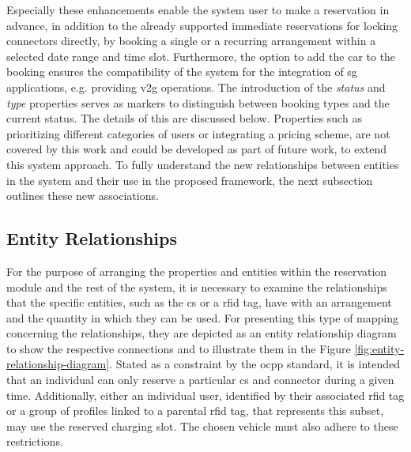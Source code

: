 \noindent Especially these enhancements enable the system user to make a reservation in advance, in addition to the already supported immediate reservations for locking connectors directly, by booking a single or a recurring arrangement within a selected date range and time slot.
Furthermore, the option to add the car to the booking ensures the compatibility of the system for the integration of \acrshort{sg} applications, e.g. providing \acrshort{v2g} operations.
The introduction of the \textit{status} and \textit{type} properties serves as markers to distinguish between booking types and the current status. The details of this are discussed below.
Properties such as prioritizing different categories of users or integrating a pricing scheme, are not covered by this work and could be developed as part of future work, to extend this system approach.
To fully understand the new relationships between entities in the system and their use in the proposed framework, the next subsection outlines these new associations.

\subsection{Entity Relationships}
\label{ch:Design:sec:Reservation:ssec:Entity Relationships}

For the purpose of arranging the properties and entities within the reservation module and the rest of the system, it is necessary to examine the relationships that the specific entities, such as the \acrshort{cs} or a \acrshort{rfid} tag, have with an arrangement and the quantity in which they can be used.
For presenting this type of mapping concerning the relationships, they are depicted as an entity relationship diagram to show the respective connections and to illustrate them in the Figure \ref{fig:entity-relationship-diagram}.
Stated as a constraint by the \acrshort{ocpp} standard, it is intended that an individual can only reserve a particular \acrshort{cs} and connector during a given time. Additionally, either an individual user, identified by their associated \acrshort{rfid} tag or a group of profiles linked to a parental \acrshort{rfid} tag, that represents this subset, may use the reserved charging slot. The chosen vehicle must also adhere to these restrictions.

